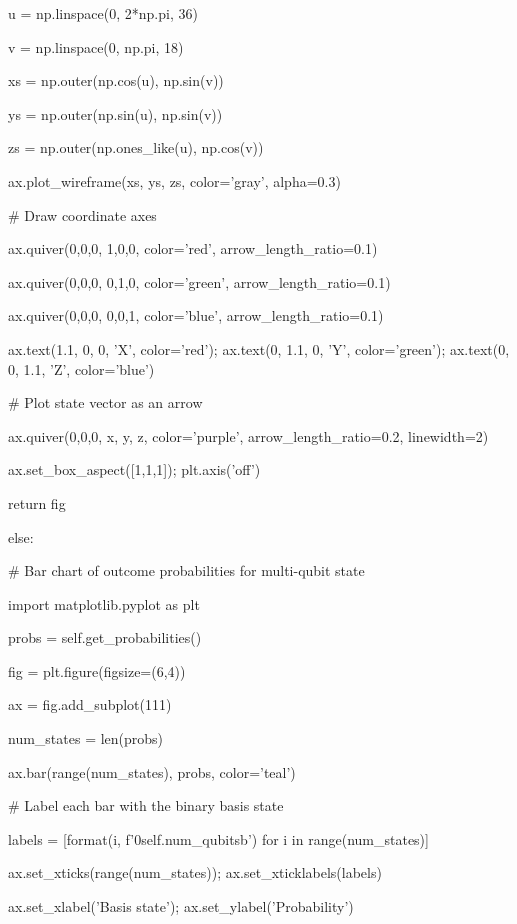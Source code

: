 \documentclass[%
oneside,                 %
final,                   %
10pt]{article}
\begin{document}
            u = np.linspace(0, 2*np.pi, 36)

            v = np.linspace(0, np.pi, 18)

            xs = np.outer(np.cos(u), np.sin(v))

            ys = np.outer(np.sin(u), np.sin(v))

            zs = np.outer(np.ones_like(u), np.cos(v))

            ax.plot_wireframe(xs, ys, zs, color='gray', alpha=0.3)

            # Draw coordinate axes

            ax.quiver(0,0,0, 1,0,0, color='red', arrow_length_ratio=0.1)

            ax.quiver(0,0,0, 0,1,0, color='green', arrow_length_ratio=0.1)

            ax.quiver(0,0,0, 0,0,1, color='blue', arrow_length_ratio=0.1)

            ax.text(1.1, 0, 0, 'X', color='red'); ax.text(0, 1.1, 0, 'Y', color='green'); ax.text(0, 0, 1.1, 'Z', color='blue')

            # Plot state vector as an arrow

            ax.quiver(0,0,0, x, y, z, color='purple', arrow_length_ratio=0.2, linewidth=2)

            ax.set_box_aspect([1,1,1]); plt.axis('off')

            return fig

        else:

            # Bar chart of outcome probabilities for multi-qubit state

            import matplotlib.pyplot as plt

            probs = self.get_probabilities()

            fig = plt.figure(figsize=(6,4))

            ax = fig.add_subplot(111)

            num_states = len(probs)

            ax.bar(range(num_states), probs, color='teal')

            # Label each bar with the binary basis state

            labels = [format(i, f'0{self.num_qubits}b') for i in range(num_states)]

            ax.set_xticks(range(num_states)); ax.set_xticklabels(labels)

            ax.set_xlabel('Basis state'); ax.set_ylabel('Probability')
\end{document}
